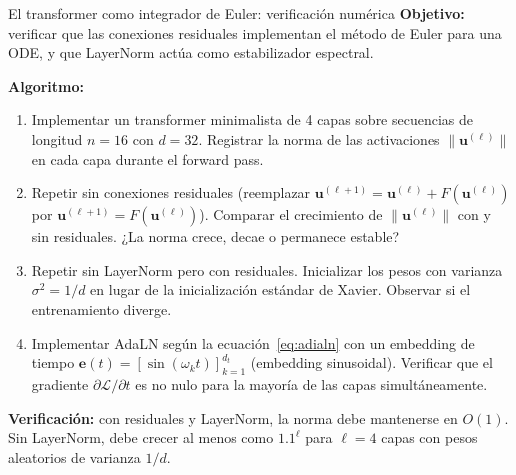 \begin{ejerciciocomp}{El transformer como integrador de Euler: verificación numérica}
\textbf{Objetivo:} verificar que las conexiones residuales implementan
el método de Euler para una ODE, y que LayerNorm actúa como
estabilizador espectral.

\medskip\noindent\textbf{Algoritmo:}
\begin{enumerate}
  \item Implementar un transformer minimalista de 4 capas sobre
        secuencias de longitud $n=16$ con $d=32$. Registrar la norma
        de las activaciones $\|\bm{u}^{(\ell)}\|$ en cada capa durante
        el forward pass.
  \item Repetir sin conexiones residuales (reemplazar
        $\bm{u}^{(\ell+1)} = \bm{u}^{(\ell)} + F(\bm{u}^{(\ell)})$
        por $\bm{u}^{(\ell+1)} = F(\bm{u}^{(\ell)})$). Comparar el
        crecimiento de $\|\bm{u}^{(\ell)}\|$ con y sin residuales.
        ¿La norma crece, decae o permanece estable?
  \item Repetir sin LayerNorm pero con residuales. Inicializar los
        pesos con varianza $\sigma^2 = 1/d$ en lugar de la
        inicialización estándar de Xavier. Observar si el entrenamiento
        diverge.
  \item Implementar AdaLN según la ecuación~\eqref{eq:adialn} con
        un embedding de tiempo $\bm{e}(t) = [\sin(\omega_k t)]_{k=1}^{d_t}$
        (embedding sinusoidal). Verificar que el gradiente
        $\partial\mathcal{L}/\partial t$ es no nulo para la mayoría de
        las capas simultáneamente.
\end{enumerate}

\medskip\noindent\textbf{Verificación:} con residuales y LayerNorm,
la norma debe mantenerse en $O(1)$. Sin LayerNorm, debe crecer al
menos como $1.1^\ell$ para $\ell = 4$ capas con pesos aleatorios de
varianza $1/d$.
\end{ejerciciocomp}

